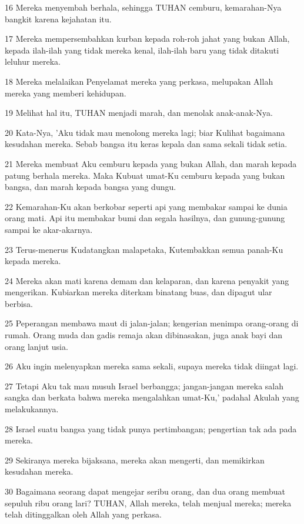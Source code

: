 \par 16 Mereka menyembah berhala, sehingga TUHAN cemburu, kemarahan-Nya bangkit karena kejahatan itu.
\par 17 Mereka mempersembahkan kurban kepada roh-roh jahat yang bukan Allah, kepada ilah-ilah yang tidak mereka kenal, ilah-ilah baru yang tidak ditakuti leluhur mereka.
\par 18 Mereka melalaikan Penyelamat mereka yang perkasa, melupakan Allah mereka yang memberi kehidupan.
\par 19 Melihat hal itu, TUHAN menjadi marah, dan menolak anak-anak-Nya.
\par 20 Kata-Nya, 'Aku tidak mau menolong mereka lagi; biar Kulihat bagaimana kesudahan mereka. Sebab bangsa itu keras kepala dan sama sekali tidak setia.
\par 21 Mereka membuat Aku cemburu kepada yang bukan Allah, dan marah kepada patung berhala mereka. Maka Kubuat umat-Ku cemburu kepada yang bukan bangsa, dan marah kepada bangsa yang dungu.
\par 22 Kemarahan-Ku akan berkobar seperti api yang membakar sampai ke dunia orang mati. Api itu membakar bumi dan segala hasilnya, dan gunung-gunung sampai ke akar-akarnya.
\par 23 Terus-menerus Kudatangkan malapetaka, Kutembakkan semua panah-Ku kepada mereka.
\par 24 Mereka akan mati karena demam dan kelaparan, dan karena penyakit yang mengerikan. Kubiarkan mereka diterkam binatang buas, dan dipagut ular berbisa.
\par 25 Peperangan membawa maut di jalan-jalan; kengerian menimpa orang-orang di rumah. Orang muda dan gadis remaja akan dibinasakan, juga anak bayi dan orang lanjut usia.
\par 26 Aku ingin melenyapkan mereka sama sekali, supaya mereka tidak diingat lagi.
\par 27 Tetapi Aku tak mau musuh Israel berbangga; jangan-jangan mereka salah sangka dan berkata bahwa mereka mengalahkan umat-Ku,' padahal Akulah yang melakukannya.
\par 28 Israel suatu bangsa yang tidak punya pertimbangan; pengertian tak ada pada mereka.
\par 29 Sekiranya mereka bijaksana, mereka akan mengerti, dan memikirkan kesudahan mereka.
\par 30 Bagaimana seorang dapat mengejar seribu orang, dan dua orang membuat sepuluh ribu orang lari? TUHAN, Allah mereka, telah menjual mereka; mereka telah ditinggalkan oleh Allah yang perkasa.

